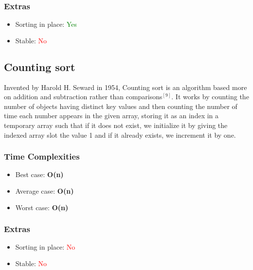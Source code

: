 \documentclass{article}
\begin{document}
\begin{multicols}{2}
\subsubsection{Extras}
\begin{itemize}
    \item Sorting in place: \textcolor{green}{Yes}
    \item Stable: \textcolor{red}{No}
\end{itemize}

\bigbreak \bigbreak \bigbreak \bigbreak \bigbreak \bigbreak \bigbreak \bigbreak \bigbreak \bigbreak \bigbreak \bigbreak \bigbreak \bigbreak \bigbreak \bigbreak \bigbreak \bigbreak \bigbreak \bigbreak



\subsection{Counting sort}
Invented by Harold H. Seward in 1954, Counting sort is an algorithm based more on addition and subtraction rather than comparisons$^{[9]}$. It works by counting the number of objects having distinct key values and then counting the number of time each number appears in the given array, storing it as an index in a temporary array such that if it does not exist, we initialize it by giving the indexed array slot the value 1 and if it already exists, we increment it by one.
\subsubsection{Time Complexities}
\begin{itemize}
    \item Best case: \textbf{O(n)}
    \item Average case: \textbf{O(n)}
    \item Worst case: \textbf{O(n)}
\end{itemize}

\subsubsection{Extras}
\begin{itemize}
    \item Sorting in place: \textcolor{red}{No}
    \item Stable: \textcolor{red}{No}
\end{itemize}

\bigbreak \bigbreak \bigbreak \bigbreak \bigbreak \bigbreak \bigbreak \bigbreak \bigbreak \bigbreak \bigbreak \bigbreak \bigbreak \bigbreak \bigbreak \bigbreak \bigbreak \bigbreak \bigbreak \bigbreak


\end{multicols}
\pagebreak
\end{document}
